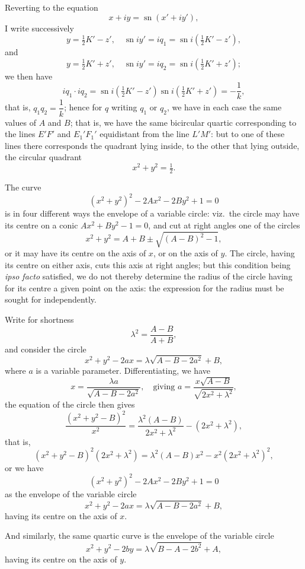 \documentclass[11pt,a4paper]{article}
\DeclareMathOperator{\sn}{sn}
\begin{document}
Reverting to the equation
\[
x + iy = \sn(x' + iy'),
\]
I write successively
\[
y = \tfrac{1}{2}K' - z',\quad \sn iy' = iq_1 = \sn i(\tfrac{1}{2}K' - z'),
\]
and
\[
y = \tfrac{1}{2}K' + z',\quad \sn iy' = iq_2 = \sn i(\tfrac{1}{2}K' + z');
\]
we then have
\[
iq_1 \cdot iq_2 = \sn i(\tfrac{1}{2}K' - z') \sn i(\tfrac{1}{2}K' + z') = -\frac{1}{k},
\]
that is, $q_1q_2 = \dfrac{1}{k}$; hence for $q$ writing $q_1$ or $q_2$, we have in each case the same values of $A$ and $B$; that is, we have the same bicircular quartic corresponding to the lines $E'F'$ and $E_1'F_1'$ equidistant from the line $L'M'$: but to one of these lines there corresponds the quadrant lying inside, to the other that lying outside, the circular quadrant
\[
x^2 + y^2 = \tfrac{1}{2}.
\]

The curve
\[
(x^2+y^2)^2 - 2Ax^2 - 2By^2 + 1 = 0
\]
is in four different ways the envelope of a variable circle: viz.\ the circle may have its centre on a conic $Ax^2 + By^2 - 1 = 0$, and cut at right angles one of the circles
\[
x^2 + y^2 = A + B \pm \sqrt{(A-B)^2 - 1},
\]
or it may have its centre on the axis of $x$, or on the axis of $y$. The circle, having its centre on either axis, cuts this axis at right angles; but this condition being \emph{ipso facto} satisfied, we do not thereby determine the radius of the circle having for its centre a given point on the axis: the expression for the radius must be sought for independently.

Write for shortness
\[
\lambda^2 = \frac{A-B}{A+B},
\]
and consider the circle
\[
x^2 + y^2 - 2ax = \lambda\sqrt{A-B-2a^2} + B,
\]
where $a$ is a variable parameter. Differentiating, we have
\[
x = \frac{\lambda a}{\sqrt{A-B-2a^2}},\quad \text{giving } a = \frac{x\sqrt{A-B}}{\sqrt{2x^2+\lambda^2}},
\]
the equation of the circle then gives
\[
\frac{(x^2+y^2-B)^2}{x^2} = \frac{\lambda^2(A-B)}{2x^2+\lambda^2} - (2x^2+\lambda^2),
\]
that is,
\[
(x^2+y^2-B)^2(2x^2+\lambda^2) = \lambda^2(A-B)x^2 - x^2(2x^2+\lambda^2)^2,
\]
or we have
\[
(x^2+y^2)^2 - 2Ax^2 - 2By^2 + 1 = 0
\]
as the envelope of the variable circle
\[
x^2 + y^2 - 2ax = \lambda\sqrt{A-B-2a^2} + B,
\]
having its centre on the axis of $x$.

And similarly, the same quartic curve is the envelope of the variable circle
\[
x^2 + y^2 - 2by = \lambda\sqrt{B-A-2b^2} + A,
\]
having its centre on the axis of $y$.
\end{document}

